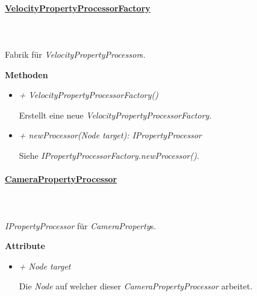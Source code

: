     \paragraph{\underline{VelocityPropertyProcessorFactory}} \mbox{}\\
    \\
    Fabrik für \textit{VelocityPropertyProcessor}s.\par

        \textbf{Methoden}
        \begin{itemize}
            \item \textit{+ VelocityPropertyProcessorFactory()}
                \begin{leftbar}[0.9\linewidth]
                    Erstellt eine neue \textit{VelocityPropertyProcessorFactory}.
                \end{leftbar}
            \item \textit{+ newProcessor(Node target): IPropertyProcessor}
                \begin{leftbar}[0.9\linewidth]
                    Siehe \textit{IPropertyProcessorFactory.newProcessor()}.
                \end{leftbar}
        \end{itemize}

    \paragraph{\underline{CameraPropertyProcessor}} \mbox{}\\
    \\
    \textit{IPropertyProcessor} für \textit{CameraProperty}s.\par

        \textbf{Attribute}
        \begin{itemize}
            \item \textit{+ Node target}
                \begin{leftbar}[0.9\linewidth]
                    Die \textit{Node} auf welcher dieser \textit{CameraPropertyProcessor} arbeitet.
                \end{leftbar}
        \end{itemize}

